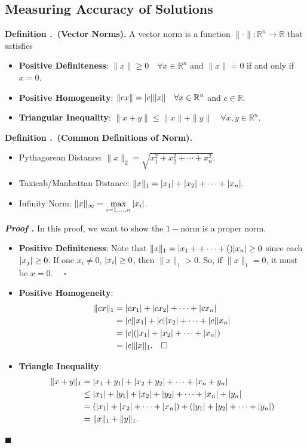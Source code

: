 \documentclass[12pt, a4paper]{article}
\newcounter{index}[subsection]
\newenvironment*{df}[1]{\par\noindent\textbf{Definition \thesubsection.\stepcounter{index}\theindex\ (#1).}}{\par}
\newcounter{nprf}[subsection]
\newenvironment*{prf}{\par\indent\textbf{\textit{Proof \stepcounter{nprf}\thenprf.}}}{\hfill$\blacksquare$\par}
\def\R{{\mathbb{R}}}
\def\dsst{\displaystyle}
\def\pqed{\quad\square}
\begin{document}
\subsection{Measuring Accuracy of Solutions}
\begin{df}{Vector Norms}
	A vector norm is a function $\|\cdot\|:\R^n\to\R$ that satisfies
	\begin{itemize}
		\item \textbf{Positive Definiteness}: $\|x\|\geq0\quad\forall x\in\R^n$ and $\|x\|=0$ if and only if $x=0$.
		\item \textbf{Positive Homogeneity}: $\|cx\|=\qty|c|\|x\|\quad\forall x\in\R^n$ and $c\in\R$.
		\item \textbf{Triangular Inequality}: $\|x+y\|\leq\|x\|+\|y\|\quad\forall x,y\in\R^n$.
	\end{itemize}	
\end{df}
\begin{df}{Common Definitions of Norm}
	\begin{itemize}
		\item Pythagorean Distance: $\|x\|_2=\sqrt{x_1^2+x_2^2+\cdots+x_n^2}$.
		\item Taxicab/Manhattan Distance: $\|x\|_1=\qty|x_1|+\qty|x_2|+\cdots+\qty|x_n|$.
		\item Infinity Norm: $\|x\|_\infty=\dsst\max_{i=1,\dots,n}\qty|x_i|$.
	\end{itemize}	
\end{df}
\begin{prf}
	In this proof, we want to show the $1-$norm is a proper norm.
	\begin{itemize}
		\item \textbf{Positive Definiteness}: Note that $\|x\|_1=\qty|x_1++\cdots+\qty|x_n|\geq0$ since each $\qty|x_j|\geq0$. If one $x_i\neq0$, $\qty|x_i|\geq0$, then $\|x\|_1>0$. So, if $\|x\|_1=0$, it must be $x=0$. $\pqed$
		\item \textbf{Positive Homogeneity}: \begin{align*}\|cx\|_1&=\qty|cx_1|+\qty|cx_2|+\cdots+\qty|cx_n|\\&=\qty|c|\qty|x_1|+\qty|c|\qty|x_2|+\cdots+\qty|c|\qty|x_n|\\&=\qty|c|\qty(\qty|x_1|+\qty|x_2|+\cdots+\qty|x_n|)\\&=\qty|c|\|x\|_1.\pqed\end{align*}
		\item \textbf{Triangle Inequality}: \begin{align*}\|x+y\|_1&=\qty|x_1+y_1|+\qty|x_2+y_2|+\cdots+\qty|x_n+y_n|\\&\leq\qty|x_1|+\qty|y_1|+\qty|x_2|+\qty|y_2|+\cdots+\qty|x_n|+\qty|y_n|\\&=\qty(\qty|x_1|+\qty|x_2|+\cdots+\qty|x_n|)+\qty(\qty|y_1|+\qty|y_2|+\cdots+\qty|y_n|)\\&=\|x\|_1+\|y\|_1.\end{align*}
	\end{itemize}	
\end{prf}
\end{document}
